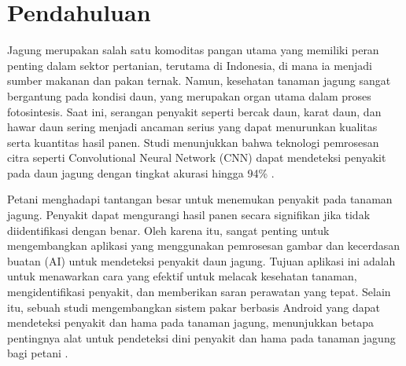 \documentclass[journal,article,submit,pdftex,moreauthors]{Definitions/mdpi}
\begin{document}



\section{Pendahuluan}

Jagung merupakan salah satu komoditas pangan utama yang memiliki peran penting dalam sektor pertanian, terutama di Indonesia, di mana ia menjadi sumber makanan dan pakan ternak. Namun, kesehatan tanaman jagung sangat bergantung pada kondisi daun, yang merupakan organ utama dalam proses fotosintesis. Saat ini, serangan penyakit seperti bercak daun, karat daun, dan hawar daun sering menjadi ancaman serius yang dapat menurunkan kualitas serta kuantitas hasil panen. Studi menunjukkan bahwa teknologi pemrosesan citra seperti Convolutional Neural Network (CNN) dapat mendeteksi penyakit pada daun jagung dengan tingkat akurasi hingga 94\% \cite{Sari2023}.

Petani menghadapi tantangan besar untuk menemukan penyakit pada tanaman jagung. Penyakit dapat mengurangi hasil panen secara signifikan jika tidak diidentifikasi dengan benar. Oleh karena itu, sangat penting untuk mengembangkan aplikasi yang menggunakan pemrosesan gambar dan kecerdasan buatan (AI) untuk mendeteksi penyakit daun jagung. Tujuan aplikasi ini adalah untuk menawarkan cara yang efektif untuk melacak kesehatan tanaman, mengidentifikasi penyakit, dan memberikan saran perawatan yang tepat. Selain itu, sebuah studi mengembangkan sistem pakar berbasis Android yang dapat mendeteksi penyakit dan hama pada tanaman jagung, menunjukkan betapa pentingnya alat untuk pendeteksi dini penyakit dan hama pada tanaman jagung bagi petani \cite{Husni2023}.
\end{document}
